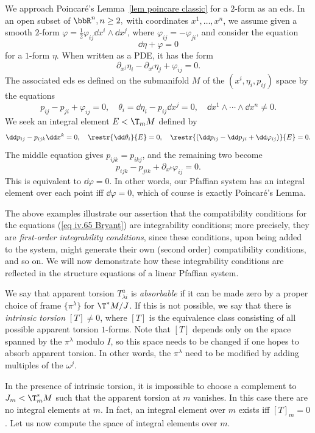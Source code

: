 \begin{example}
    We approach Poincar\'e's Lemma~\ref{lem poincare classic} for a $2$-form as an \gls{eds}. In an open subset of $\bbR^n,n\geq 2,$ with coordinates $x^1,\ldots,x^n$, we assume given a smooth $2$-form $\varphi=\frac12\varphi_{ij}\dd x^i\wedge\dd x^j$, where $\varphi_{ij}=-\varphi_{ji}$, and consider the equation 
    \[\dd\eta+\varphi=0\]
    for a $1$-form $\eta$. When written as a PDE, it has the form 
    \[\partial_{x^j}\eta_i-\partial_{x^i}\eta_j+\varphi_{ij}=0.\]
    The associated \gls{eds} es defined on the submanifold $M$ of the $(x^i,\eta_i,p_{ij})$ space by the equations 
    \[p_{ij}-p_{ji}+\varphi_{ij}=0,\quad \theta_i=\dd \eta_i-p_{ij}\dd x^j=0,\quad \dd x ^1\wedge\cdots\wedge\dd x^n\neq 0.\]
    We seek an integral element $E<\T_m M$ defined by 
    \[\dd p_{ij}-p_{ijk}\dd x^k=0,\quad \restr{\dd \theta_i}{E}=0,\quad \restr{(\dd p_{ij}-\dd p_{ji}+\dd\varphi_{ij})}{E}=0.\]
    The middle equation gives $p_{ijk}=p_{ikj}$, and the remaining two become 
    \[p_{ijk}-p_{jik}+\partial_{x^k}\varphi_{ij}=0.\]
    This is equivalent to $\dd\varphi=0$. In other words, our Pfaffian system has an integral element over each point iff $\dd\varphi=0$, which of course is exactly Poincar\'e's Lemma.
\end{example}

The above examples illustrate our assertion that the compatibility conditions for the equations (\ref{eq iv.65 Bryant}) are integrability conditions; more precisely, they are \emph{first-order integrability conditions}, since these conditions, upon being added to the system, might generate their own (second order) compatibility conditions, and so on. We will now demonstrate how these integrability conditions are reflected in the structure equations of a linear Pfaffian system.

We say that apparent torsion $T^a_{\lambda i}$ is \emph{absorbable} if it can be made zero by a proper choice of frame $\{\pi^\lambda\}$ for $\T^\ast M\slash J$. If this is not possible, we say that there is \emph{intrinsic torsion} $[T]\neq 0$, where $[T]$ is the equivalence class consisting of all possible apparent torsion $1$-forms. Note that $[T]$ depends only on the space spanned by the $\pi^\lambda$ modulo $I$, so this space needs to be changed if one hopes to absorb apparent torsion. In other words, the $\pi^\lambda$ need to be modified by adding multiples of the $\omega^j$.

In the presence of intrinsic torsion, it is impossible to choose a complement to $J_m<\T^\ast_mM$ such that the apparent torsion at $m$ vanishes. In this case there are no integral elements at $m$. In fact, an integral element over $m$ exists iff $[T]_m=0$. Let us now compute the space of integral elements over $m$.

